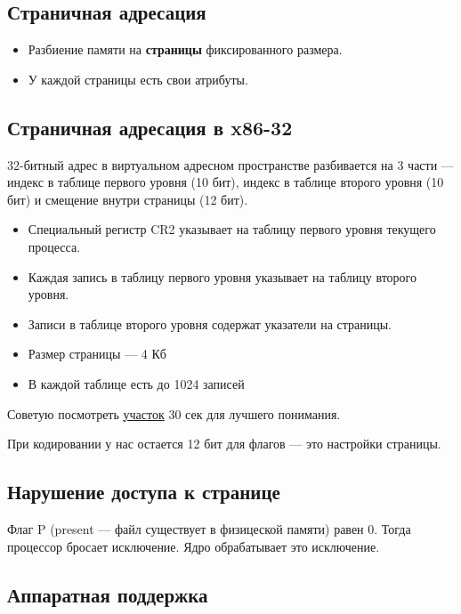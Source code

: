 \subsection{Страничная адресация}

\begin{itemize}
	\item Разбиение памяти на \textbf{страницы} фиксированного размера.
	\item У каждой страницы есть свои атрибуты.
\end{itemize}

\subsection{Страничная адресация в x86-32}

32-битный адрес в виртуальном адресном пространстве разбивается на 3 части --- 
индекс в таблице первого уровня (10 бит), индекс в таблице второго уровня (10 бит) и 
смещение внутри страницы (12 бит).

\begin{itemize}
	\item Специальный регистр CR2 указывает на таблицу первого уровня текущего процесса.
	\item Каждая запись в таблицу первого уровня указывает на таблицу второго уровня.
	\item Записи в таблице второго уровня содержат указатели на страницы.
\end{itemize}

\begin{itemize}
	\item Размер страницы --- 4 Кб
	\item В каждой таблице есть до 1024 записей
\end{itemize}

Советую посмотреть \href{https://youtu.be/uSkrfUIYhqw?t=1355}{участок}
30 сек для лучшего понимания.

При кодировании у нас остается 12 бит для флагов --- это настройки страницы.

\subsection{Нарушение доступа к странице}

Флаг P (present --- файл существует в физицеской памяти) равен 0. Тогда процессор бросает исключение. Ядро обрабатывает это исключение.

\subsection{Аппаратная поддержка}

